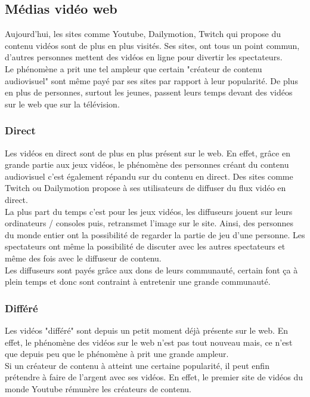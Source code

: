 \documentclass[11pt]{report} %
\begin{document}
		\subsection{Médias vidéo web}
		 Aujourd'hui, les sites comme Youtube, Dailymotion, Twitch qui propose du contenu vidéos sont de plus en plus visités. Ses sites, ont tous un point commun, d'autres personnes mettent des vidéos en ligne pour divertir les spectateurs. \\
		 Le phénomène a prit une tel ampleur que certain "créateur de contenu audiovisuel" sont même payé par ses sites par rapport à leur popularité. De plus en plus de personnes, surtout les jeunes, passent leurs temps devant des vidéos sur le web que sur la télévision.
			\subsubsection{Direct}
			Les vidéos en direct sont de plus en plus présent sur le web. En effet, grâce en grande partie aux jeux vidéos, le phénomène des personnes créant du contenu audiovisuel c'est également répandu sur du contenu en direct. Des sites comme Twitch ou Dailymotion propose à ses utilisateurs de diffuser du flux vidéo en direct. \\ 
			La plus part du temps c'est pour les jeux vidéos, les diffuseurs jouent sur leurs ordinateurs / consoles puis, retransmet l'image sur le site. Ainsi, des personnes du monde entier ont la possibilité de regarder la partie de jeu d'une personne. Les spectateurs ont même la possibilité de discuter avec les autres spectateurs et même des fois avec le diffuseur de contenu.\\
			Les diffuseurs sont payés grâce aux dons de leurs communauté, certain font ça à plein temps et donc sont contraint à entretenir une grande communauté.
			\subsubsection{Différé}
			Les vidéos "différé" sont depuis un petit moment déjà présente sur le web. En effet, le phénomène des vidéos sur le web n'est pas tout nouveau mais, ce n'est que depuis peu que le phénomène à prit une grande ampleur. \\
			Si un créateur de contenu à atteint une certaine popularité, il peut enfin prétendre à faire de l'argent avec ses vidéos. En effet, le premier site de vidéos du monde Youtube rémunère les créateurs de contenu.
\end{document}
